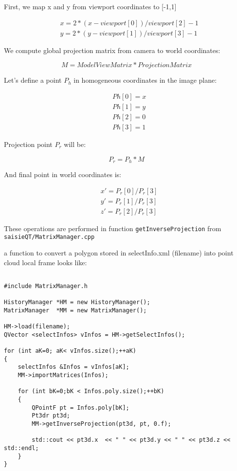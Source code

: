 First, we map x and y from viewport coordinates to [-1,1]

\begin{eqnarray*}
        & x = 2 * ( x - viewport[0] ) / viewport[2] - 1\\
    & y = 2 * ( y - viewport[1] ) / viewport[3] - 1
\end{eqnarray*}

We compute global projection matrix from camera to world coordinates:

\begin{equation*}
        M  = ModelViewMatrix * ProjectionMatrix
\end{equation*}

Let's define a point $P_h$ in homogeneous coordinates in the image plane:

\begin{eqnarray*}
        & Ph[0] = x\\
        & Ph[1] = y\\
        & Ph[2] = 0\\
        & Ph[3] = 1
\end{eqnarray*}

Projection point $P_r$ will be:

\begin{equation*}
        P_r = P_h*M
\end{equation*}

And final point in world coordinates is:

\begin{eqnarray*}
        & x' = P_{r}[0]/P_{r}[3] \\
        & y' = P_{r}[1]/P_{r}[3] \\
        & z' = P_{r}[2]/P_{r}[3]
\end{eqnarray*}


These operations are performed in function {\tt getInverseProjection} from {\tt saisieQT/MatrixManager.cpp }

a function to convert a polygon stored in selectInfo.xml (filename) into point cloud local frame looks like:

\begin{verbatim}

#include MatrixManager.h

HistoryManager *HM = new HistoryManager();
MatrixManager  *MM = new MatrixManager();

HM->load(filename);
QVector <selectInfos> vInfos = HM->getSelectInfos();

for (int aK=0; aK< vInfos.size();++aK)
{
    selectInfos &Infos = vInfos[aK];
    MM->importMatrices(Infos);

    for (int bK=0;bK < Infos.poly.size();++bK)
    {
        QPointF pt = Infos.poly[bK];
        Pt3dr pt3d;
        MM->getInverseProjection(pt3d, pt, 0.f);

        std::cout << pt3d.x  << " " << pt3d.y << " " << pt3d.z << std::endl;
    }
}

\end{verbatim}



